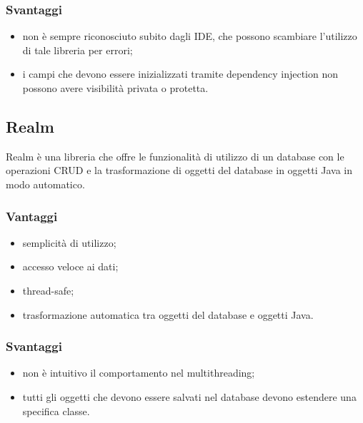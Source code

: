 \documentclass[../Tesi.tex]{subfiles}
\begin{document}
		\subsubsection{Svantaggi}
			\begin{itemize}
				\item non è sempre riconosciuto subito dagli IDE, che possono scambiare l'utilizzo di tale libreria per errori;
				\item i campi che devono essere inizializzati tramite dependency injection non possono avere visibilità privata o protetta.
			\end{itemize}

	\subsection{Realm}
		Realm è una libreria che offre le funzionalità di utilizzo di un database con le operazioni CRUD e la trasformazione di oggetti del database in oggetti Java in modo automatico.
		\subsubsection{Vantaggi}
			\begin{itemize}
				\item semplicità di utilizzo;
				\item accesso veloce ai dati;
				\item thread-safe;
				\item trasformazione automatica tra oggetti del database e oggetti Java.
			\end{itemize}
		\subsubsection{Svantaggi}
			\begin{itemize}
				\item non è intuitivo il comportamento nel multithreading;
				\item tutti gli oggetti che devono essere salvati nel database devono estendere una specifica classe.
			\end{itemize}
\end{document}
